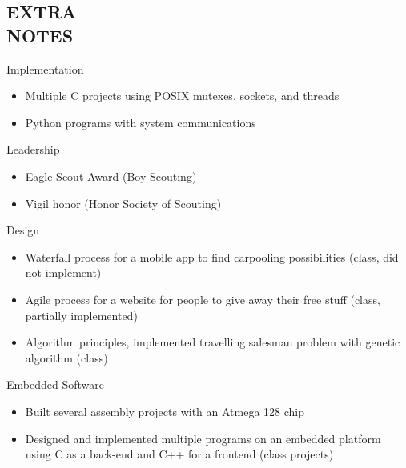 \documentclass[mm]{res}
\begin{document}
\begin{resume}
\section{EXTRA \\ NOTES}     
	Implementation
		\begin{itemize}
			\item Multiple C projects using POSIX mutexes, sockets, and threads
			\item Python programs with system communications
		\end{itemize}    
            Leadership
		\begin{itemize}
			\item Eagle Scout Award (Boy Scouting)
			\item Vigil honor (Honor Society of Scouting)
		\end{itemize}
	Design
		\begin{itemize}
			\item Waterfall process for a mobile app to find carpooling possibilities (class, did not implement)
			\item Agile process for a website for people to give away their free stuff (class, partially implemented)
			\item Algorithm principles, implemented travelling salesman problem with genetic algorithm (class)
		\end{itemize}
	Embedded Software
		\begin{itemize}
			\item Built several assembly projects with an Atmega 128 chip
			\item Designed and implemented multiple programs on an embedded platform using C as a back-end and C++ for a frontend (class projects)
 		\end{itemize}

\end{resume}
\end{document}
